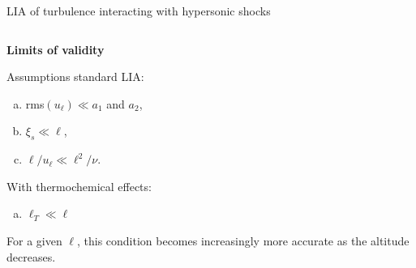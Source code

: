\documentclass[9pt, aspectratio=1609]{beamer}
\begin{document}
\begin{frame}[t]{\large LIA of turbulence interacting with hypersonic shocks}
\begin{columns}[c]
\begin{column}{.35\textwidth}
    \textbf{Limits of validity}

    \vspace{0.1cm}
    
    Assumptions standard LIA:
    \begin{enumerate}[(a)]
        \item rms$(u_\ell) \ll a_1$ and $a_2$,
        \item $\xi_s \ll \ell$,
        \item $ \ell/ u_\ell\ll \ell^2/\nu$.
    \end{enumerate}
    
    With thermochemical effects:
    \begin{enumerate}[(d)]
         \item $\ell_T\ll \ell$
    \end{enumerate}
    For a given $\ell$, this condition becomes increasingly more accurate as the  altitude decreases.
    
    \end{column}%
\end{columns}


\end{frame}
\end{document}
